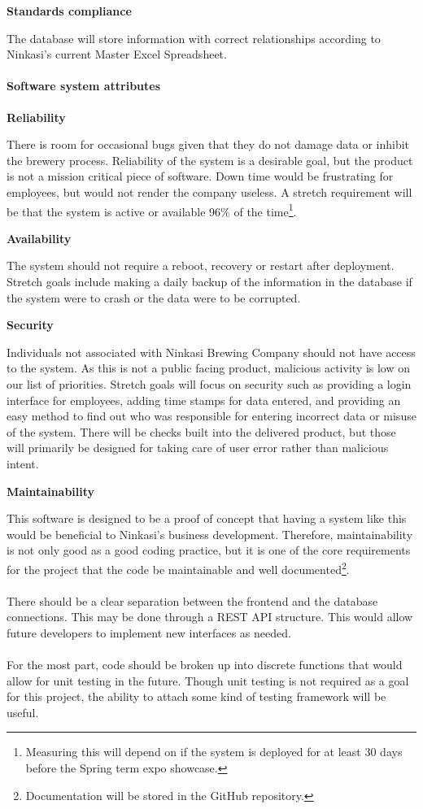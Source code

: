 		\textbf{Standards compliance}

		The database will store information with correct relationships according to Ninkasi's current Master Excel Spreadsheet.

	\paragraph{Software system attributes}
		\textbf{Reliability}

		There is room for occasional bugs given that they do not damage data or inhibit the brewery process.
		Reliability of the system is a desirable goal, but the product is not a mission critical piece of software.
		Down time would be frustrating for employees, but would not render the company useless.
        A stretch requirement will be that the system is active or available 96\% of the time\footnote{Measuring this will depend on if the system is deployed for at least 30 days before the Spring term expo showcase.}.

		\textbf{Availability}

		The system should not require a reboot, recovery or restart after deployment.
		Stretch goals include making a daily backup of the information in the database if the system were to crash or the data were to be corrupted.

		\textbf{Security}

		Individuals not associated with Ninkasi Brewing Company should not have access to the system.
		As this is not a public facing product, malicious activity is low on our list of priorities.
		Stretch goals will focus on security such as providing a login interface for employees, adding time stamps for data entered, and providing an easy method to find out who was responsible for entering incorrect data or misuse of the system.
		There will be checks built into the delivered product, but those will primarily be designed for taking care of user error rather than malicious intent.

		\textbf{Maintainability}

		This software is designed to be a proof of concept that having a system like this would be beneficial to Ninkasi's business development.
		Therefore, maintainability is not only good as a good coding practice, but it is one of the core requirements for the project that the code be maintainable and well documented\footnote{Documentation will be stored in the GitHub repository.}.
		\\ \\
		There should be a clear separation between the frontend and the database connections.
        This may be done through a REST API structure.
        This would allow future developers to implement new interfaces as needed.
		\\ \\
		For the most part, code should be broken up into discrete functions that would allow for unit testing in the future.
		Though unit testing is not required as a goal for this project, the ability to attach some kind of testing framework will be useful.

